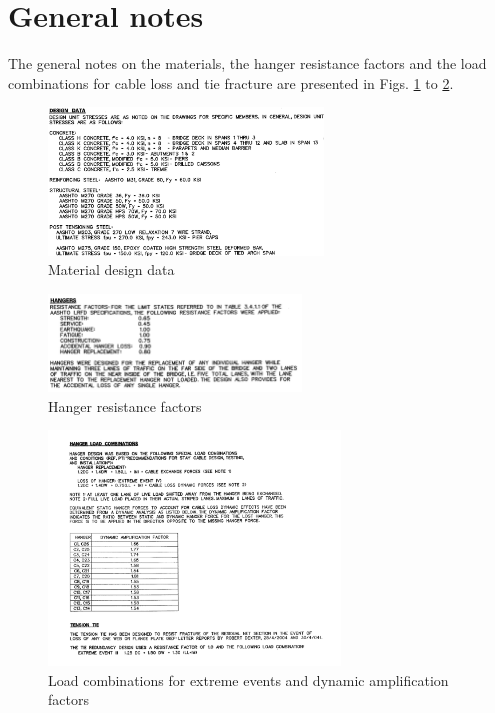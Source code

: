 \section{General notes} \label{app:general_notes}
The general notes on the materials, the hanger resistance factors and the load combinations for cable loss and tie fracture are presented in Figs. \ref{fig:materials} to \ref{fig:hanger_load_combination}.
\begin{figure}[H]
    \centering
    \includegraphics[width=0.65\textwidth]{overleaf/Appendix/Design drawings/Material design data.png}
    \caption{Material design data}
    \label{fig:materials}
\end{figure}
\begin{figure}[H]
    \centering
    \includegraphics[trim={0 0.9cm 0 0cm},clip, width=0.6\textwidth]{overleaf/Appendix/Design drawings/Hanger resistance factor.PNG}
    \caption{Hanger resistance factors}
\end{figure}
\begin{figure}[H]
    \centering
    \includegraphics[trim={0 0.5cm 0 0.7cm},clip, width=0.69\textwidth]{overleaf/Appendix/Design drawings/Hanger load combination.png}
    \caption{Load combinations for extreme events and dynamic amplification factors}
    \label{fig:hanger_load_combination}
\end{figure}

